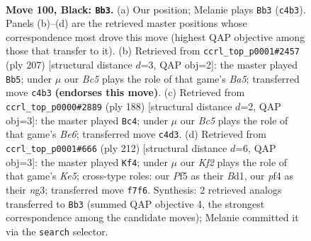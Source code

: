 \documentclass[11pt]{article}
\begin{document}
\clearpage

\begin{figure}[p]\centering
\begin{subfigure}{0.46\textwidth}\centering
\resizebox{\linewidth}{!}{%
\newchessgame
\chessboard[
  setfen={7K/5k2/8/5p2/2b2P2/8/8/8 b - - 15 100},
  showmover=false,
  pgfstyle=straightmove, color=movearrow, markmove={c4-b3}
]}
\caption{}
\end{subfigure}\hfill
\begin{subfigure}{0.46\textwidth}\centering
\resizebox{\linewidth}{!}{%
\newchessgame
\chessboard[
  setfen={4k3/8/p7/P7/b7/8/3K3B/8 b - - 15 104},
  showmover=false,
  pgfstyle=straightmove, color=movearrow, markmove={a4-b5}
]}
\caption{}
\end{subfigure}
\\[4pt]
\begin{subfigure}{0.46\textwidth}\centering
\resizebox{\linewidth}{!}{%
\newchessgame
\chessboard[
  setfen={8/8/1p2B3/1P4b1/8/7K/8/6k1 w - - 3 95},
  showmover=false,
  pgfstyle=straightmove, color=movearrow, markmove={e6-c4}
]}
\caption{}
\end{subfigure}\hfill
\begin{subfigure}{0.46\textwidth}\centering
\resizebox{\linewidth}{!}{%
\newchessgame
\chessboard[
  setfen={7B/4k3/8/4K3/8/6n1/8/3B4 w - - 11 107},
  showmover=false,
  pgfstyle=straightmove, color=movearrow, markmove={e5-f4}
]}
\caption{}
\end{subfigure}
\caption{\textbf{Move 100, Black: \texttt{Bb3}.} (a) Our position; Melanie plays \texttt{Bb3} (\texttt{c4b3}). Panels (b)--(d) are the retrieved master positions whose correspondence most drove this move (highest QAP objective among those that transfer to it). (b) Retrieved from \texttt{ccrl\_top\_p0001\#2457} (ply 207) [structural distance $d$=3, QAP obj=2]: the master played \texttt{Bb5}; under $\mu$ our \emph{Bc5} plays the role of that game's \emph{Ba5}; transferred move \texttt{c4b3} \textbf{(endorses this move)}. (c) Retrieved from \texttt{ccrl\_top\_p0000\#2889} (ply 188) [structural distance $d$=2, QAP obj=3]: the master played \texttt{Bc4}; under $\mu$ our \emph{Bc5} plays the role of that game's \emph{Be6}; transferred move \texttt{c4d3}. (d) Retrieved from \texttt{ccrl\_top\_p0001\#666} (ply 212) [structural distance $d$=6, QAP obj=3]: the master played \texttt{Kf4}; under $\mu$ our \emph{Kf2} plays the role of that game's \emph{Ke5}; cross-type roles: our \emph{P}f5 as their \emph{B}d1, our \emph{p}f4 as their \emph{n}g3; transferred move \texttt{f7f6}. Synthesis: 2 retrieved analogs transferred to \texttt{Bb3} (summed QAP objective 4, the strongest correspondence among the candidate moves); Melanie committed it via the \texttt{search} selector.}
\label{fig:thought-m199}
\end{figure}
\end{document}
